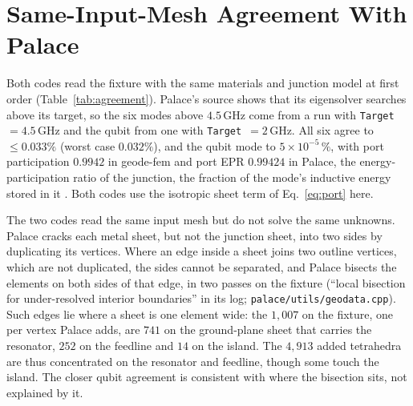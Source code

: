 \documentclass{anvil-paper}
\begin{document}
\section{Same-Input-Mesh Agreement With Palace}
\label{sec:agreement}

Both codes read the fixture with the same materials and junction model at
first order (Table~\ref{tab:agreement}). Palace's source shows that its
eigensolver searches above its target, so the six modes above $4.5$\,GHz come from a run
with \texttt{Target}~$=4.5$\,GHz and the qubit from one with
\texttt{Target}~$=2$\,GHz. All six agree to $\leq 0.033\%$ (worst case
$0.032\%$), and the qubit mode to $5\times10^{-5}\,\%$, with port
participation $0.9942$ in geode-fem and port EPR $0.99424$ in Palace, the
energy-participation ratio of the junction, the fraction of the mode's
inductive energy stored in it \citep{minev2021energy}. Both codes use the
isotropic sheet term of Eq.~\eqref{eq:port} here.

The two codes read the same input mesh but do not solve the same unknowns.
Palace cracks each metal sheet, but not the junction sheet, into two sides
by duplicating its vertices. Where an edge inside a sheet joins two outline
vertices, which are not duplicated, the sides cannot be separated, and
Palace bisects the elements on both sides of that edge, in two passes on
the fixture (``local bisection
for under-resolved interior boundaries'' in its log;
\texttt{palace/utils/geodata.cpp}). Such edges lie where a sheet is one
element wide: the $1{,}007$ on the fixture, one per vertex Palace adds, are
$741$ on the ground-plane sheet that carries the resonator, $252$ on the
feedline and $14$ on the island. The $4{,}913$ added tetrahedra are thus
concentrated on the resonator and feedline, though some touch the island.
The closer qubit agreement is consistent with where the bisection sits,
not explained by it.
\end{document}
